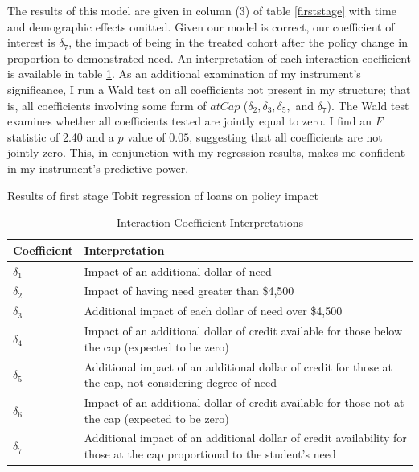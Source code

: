 \documentclass[12pt]{article}
\newcommand{\regs}{../Analysis/Regressions/Output/}
\begin{document}
	 The results of this model are given in column (3) of table \ref{firststage} with time and demographic effects omitted. Given our model is correct, our coefficient of interest is $\delta_7$, the impact of being in the treated cohort after the policy change in proportion to demonstrated need. An interpretation of each interaction coefficient is available in table \ref{coefInterp}. As an additional examination of my instrument's significance, I run a Wald test on all coefficients not present in my structure; that is, all coefficients involving some form of $atCap$ ($\delta_2, \delta_3, \delta_5,$ and $\delta_7$). The Wald test examines whether all coefficients tested are jointly equal to zero. I find an $F$ statistic of 2.40 and a $p$ value of $0.05$, suggesting that all coefficients are not jointly zero. This, in conjunction with my regression results, makes me confident in my instrument's predictive power.
	 
	 \begin{table}
	 	\centering
	 	\caption{Results of first stage Tobit regression of loans on policy impact}	 
	 	\resizebox{\textwidth}{!}{	
		 	
		 }
	 	\label{firststage}
	 \end{table}
	
	\begin{table}
		\centering
		\caption{Interaction Coefficient Interpretations}		
		\begin{tabular}{lp{8cm}}
			\toprule
			Coefficient & Interpretation\\
			\midrule
			$\delta_1$ & Impact of an additional dollar of need\\
			$\delta_2$ & Impact of having need greater than \$4,500 \\
			$\delta_3$ & Additional impact of each dollar of need over \$4,500 \\
			$\delta_4$ & Impact of an additional dollar of credit available for those below the cap (expected to be zero)\\
			$\delta_5$ & Additional impact of an additional dollar of credit for those at the cap, not considering degree of need\\
			$\delta_6$ & Impact of an additional dollar of credit available for those not at the cap (expected to be zero)\\
			$\delta_7$ & Additional impact of an additional dollar of credit availability for those at the cap proportional to the student's need \\
			\bottomrule
		\end{tabular}
	
		\label{coefInterp}
	\end{table}
	
\end{document}
